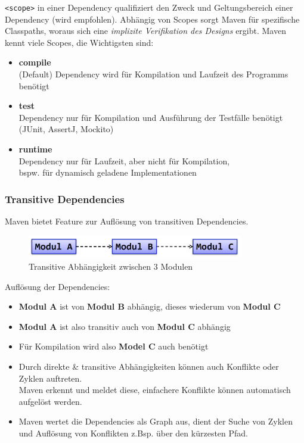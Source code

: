 \documentclass[a4paper]{article}
\begin{document}
		\texttt{<scope>} in einer Dependency qualifiziert den Zweck und Geltungsbereich einer Dependency (wird empfohlen). 
		Abhängig von Scopes sorgt Maven für spezifische Classpaths, woraus sich eine \textit{implizite Verifikation des Designs} ergibt. 
		Maven kennt viele Scopes, die Wichtigsten sind:
		\begin{itemize}
			\item \textbf{compile}\\
					(Default) Dependency wird für Kompilation und Laufzeit des Programms benötigt
					
			\item \textbf{test}\\
					Dependency nur für Kompilation und Ausführung der Testfälle benötigt (JUnit, AssertJ, Mockito)
					
			\item \textbf{runtime}\\
					Dependency nur für Laufzeit, aber nicht für Kompilation, \\
					bspw. für dynamisch geladene Implementationen
			
		\end{itemize}
		
		\subsubsection{Transitive Dependencies}
		
		Maven bietet Feature zur Auflösung von transitiven Dependencies.
		
		\begin{figure}[!htb]
			\centering
			\includegraphics[keepaspectratio, height=1cm]{img/dependencymanagement/transitive_dependencies.png}
			\caption{Transitive Abhängigkeit zwischen 3 Modulen}
			\label{fig:transitive}
		\end{figure}
	
		Auflösung der Dependencies:
		\begin{itemize}
			\item \textbf{Modul A} ist von \textbf{Modul B} abhängig, dieses wiederum von \textbf{Modul C}
			\item \textbf{Modul A} ist also transitiv auch von \textbf{Modul C} abhängig
			\item Für Kompilation wird also \textbf{Model C} auch benötigt\\
			
			\item Durch direkte \& transitive Abhängigkeiten können auch Konflikte oder Zyklen auftreten.\\
			Maven erkennt und meldet diese, einfachere Konflikte können automatisch aufgelöst werden.
			\item Maven wertet die Dependencies als Graph aus, dient der Suche von Zyklen und Auflösung von Konflikten z.Bsp. über den kürzesten Pfad.
		\end{itemize}
	
\end{document}
